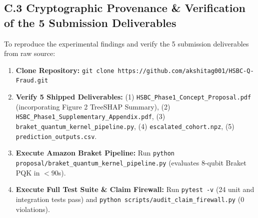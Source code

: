 \documentclass[10pt,a4paper]{article}
\begin{document}
\subsection*{C.3 Cryptographic Provenance \& Verification of the 5 Submission Deliverables}
To reproduce the experimental findings and verify the 5 submission deliverables from raw source:
\begin{enumerate}[leftmargin=*,itemsep=0.2pt,topsep=0.5pt]
\item \textbf{Clone Repository:} \texttt{git clone https://github.com/akshitag001/HSBC-Q-Fraud.git}
\item \textbf{Verify 5 Shipped Deliverables:} (1) \texttt{HSBC\_Phase1\_Concept\_Proposal.pdf} (incorporating Figure 2 TreeSHAP Summary), (2) \texttt{HSBC\_Phase1\_Supplementary\_Appendix.pdf}, (3) \texttt{braket\_quantum\_kernel\_pipeline.py}, (4) \texttt{escalated\_cohort.npz}, (5) \texttt{prediction\_outputs.csv}.
\item \textbf{Execute Amazon Braket Pipeline:} Run \texttt{python proposal/braket\_quantum\_kernel\_pipeline.py} (evaluates 8-qubit Braket PQK in $<90$s).
\item \textbf{Execute Full Test Suite \& Claim Firewall:} Run \texttt{pytest -v} (24 unit and integration tests pass) and \texttt{python scripts/audit\_claim\_firewall.py} (0 violations).
\end{enumerate}
\end{document}

